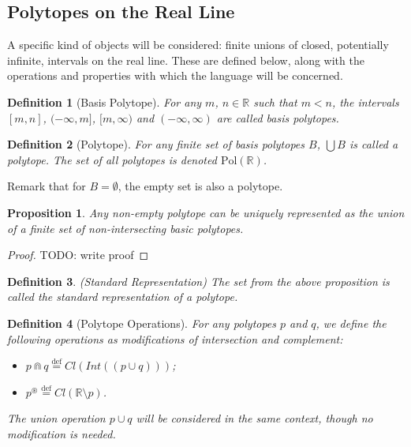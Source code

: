 \documentclass{article}
\newtheorem*{definition}{Definition}
\newtheorem*{proposition}{Proposition}
\newcommand{\R}{\mathbb{R}}
\newcommand{\bcup}{\cup}
\newcommand{\bcap}{\Cap}
\newcommand{\bstar}{^\circledast}
\newcommand{\Pol}{\text{Pol}}
\newcommand{\eqdef}{\stackrel{\text{def}}{=}}
\begin{document}
\subsection{Polytopes on the Real Line}

A specific kind of objects will be considered: finite unions of closed, potentially infinite, intervals on the real line. These are defined below, along with the operations and properties with which the language will be concerned.

\begin{definition}[Basis Polytope]
For any $m$, $n \in \R$ such that $m < n$, the intervals $[m, n]$, $(-\infty, m]$, $[m, \infty)$ and $(-\infty, \infty)$ are called \emph{basis polytopes}.
\end{definition}

\begin{definition}[Polytope]
For any finite set of basis polytopes $B$, $\bigcup B$ is called a \emph{polytope}. The set of all polytopes is denoted $\Pol(\R)$.
\end{definition}

Remark that for $B = \emptyset$, the empty set is also a polytope.

\begin{proposition}
Any non-empty polytope can be uniquely represented as the union of a finite set of non-intersecting basic polytopes.
\end{proposition}
\begin{proof}
  TODO: write proof
\end{proof}

\begin{definition}(Standard Representation)
The set from the above proposition is called the \emph{standard representation} of a polytope.
\end{definition}

\begin{definition}[Polytope Operations]
For any polytopes $p$ and $q$, we define the following operations as modifications of intersection and complement:
\begin{itemize}
  \item $p \bcap q \eqdef Cl(Int((p \cup q)))$;
  \item $p \bstar \eqdef Cl(\R \setminus p) $.
\end{itemize}
The union operation $p \bcup q$ will be considered in the same context, though no modification is needed.
\end{definition}
\end{document}
